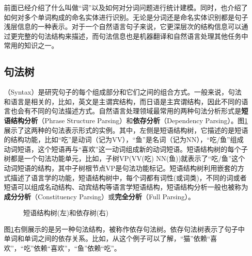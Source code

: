 \parinterval 前面已经介绍了什么叫做“词”以及如何对分词问题进行统计建模。同时，也介绍了如何对多个单词构成的命名实体进行识别。无论是分词还是命名实体识别都是句子浅层信息的一种表示。对于一个自然语言句子来说，它更深层次的结构信息可以通过更完整的句法结构来描述，而句法信息也是机器翻译和自然语言处理其他任务中常用的知识之一。


\subsection{句法树}

（Syntax）是研究句子的每个组成部分和它们之间的组合方式。一般来说，句法和语言是相关的，比如，英文是主谓宾结构，而日语是主宾谓结构，因此不同的语言也会有不同的句法描述方式。自然语言处理领域最常用的两种句法分析形式是{\small\sffamily\bfseries{短语结构分析}}（Phrase Structure Parsing）和{\small\sffamily\bfseries{依存分析}}（Dependency Parsing）。图\ref{fig:3.4-1}展示了这两种的句法表示形式的实例。其中，左侧是短语结构树，它描述的是短语的结构功能，比如“吃”是动词（记为VV），“鱼”是名词（记为NN），“吃/鱼”组成动词短语，这个短语再与“喜欢”这一动词组成新的动词短语。短语结构树的每个子树都是一个句法功能单元，比如，子树VP(VV(吃) NN(鱼))就表示了“吃/鱼”这个动词短语的结构，其中子树根节点VP是句法功能标记。短语结构树利用嵌套的方式描述了语言学的功能，短语结构树中，每个词都有词性(或词类)，不同的词或者短语可以组成名动结构、动宾结构等语言学短语结构，短语结构分析一般也被称为{\small\sffamily\bfseries{成分分析}}（Constituency Parsing）或{\small\sffamily\bfseries{完全分析}}（Full Parsing）。

\begin{figure}[htp]
    \centering

    \caption{短语结构树(左)和依存树(右)}
    \label{fig:3.4-1}
\end{figure}

\parinterval 图\ref{fig:3.4-1}右侧展示的是另一种句法结构，被称作依存句法树。依存句法树表示了句子中单词和单词之间的依存关系。比如，从这个例子可以了解，“猫”依赖“喜欢”，“吃”依赖“喜欢”，“鱼”依赖“吃”。

